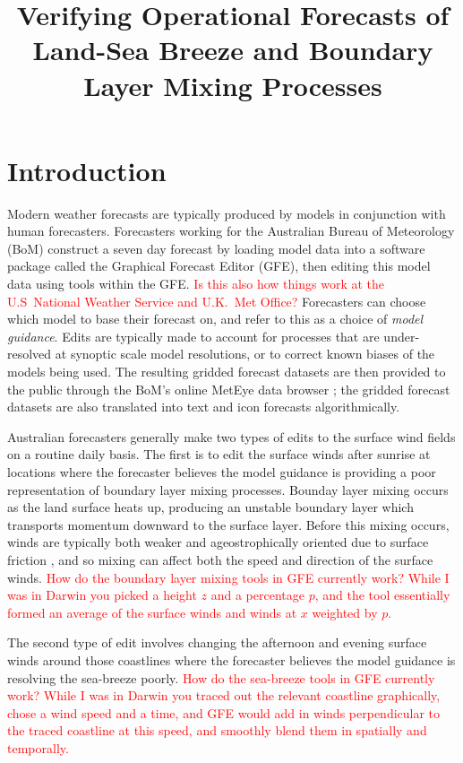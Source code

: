 \documentclass{ametsoc}
\title{Verifying Operational Forecasts of Land-Sea Breeze and Boundary Layer Mixing Processes}
\affiliation{School of Earth Sciences, and ARC Centre of Excellence for Climate Extremes, The University of Melbourne, Melbourne, Victoria, Australia.}
\begin{document}
\maketitle

\section{Introduction}
\label{Sec:Introduction}
Modern weather forecasts are typically produced by models in conjunction with human forecasters. Forecasters working for the Australian Bureau of Meteorology (BoM) construct a seven day forecast by loading model data into a software package called the Graphical Forecast Editor (GFE), then editing this model data using tools within the GFE. \textcolor{red}{Is this also how things work at the U.S~National Weather Service and U.K.~Met Office?} Forecasters can choose which model to base their forecast on, and refer to this as a choice of \textit{model guidance}. Edits are typically made to account for processes that are under-resolved at synoptic scale model resolutions, or to correct known biases of the models being used. The resulting gridded forecast datasets are then provided to the public through the BoM's online MetEye data browser \citep{bomMetEye19}; the gridded forecast datasets are also translated into text and icon forecasts algorithmically.  

Australian forecasters generally make two types of edits to the surface wind fields on a routine daily basis. The first is to edit the surface winds after sunrise at locations where the forecaster believes the model guidance is providing a poor representation of boundary layer mixing processes. Bounday layer mixing occurs as the land surface heats up, producing an unstable boundary layer which transports momentum downward to the surface layer. Before this mixing occurs, winds are typically both weaker and ageostrophically oriented due to surface friction \citep{lee18}, and so mixing can affect both the speed and direction of the surface winds. \textcolor{red}{How do the boundary layer mixing tools in GFE currently work? While I was in Darwin you picked a height $z$ and a percentage $p$, and the tool essentially formed an average of the surface winds and winds at $x$ weighted by $p$.}

The second type of edit involves changing the afternoon and evening surface winds around those coastlines where the forecaster believes the model guidance is resolving the sea-breeze poorly. \textcolor{red}{How do the sea-breeze tools in GFE currently work? While I was in Darwin you traced out the relevant coastline graphically, chose a wind speed and a time, and GFE would add in winds perpendicular to the traced coastline at this speed, and smoothly blend them in spatially and temporally.} 
\end{document}

